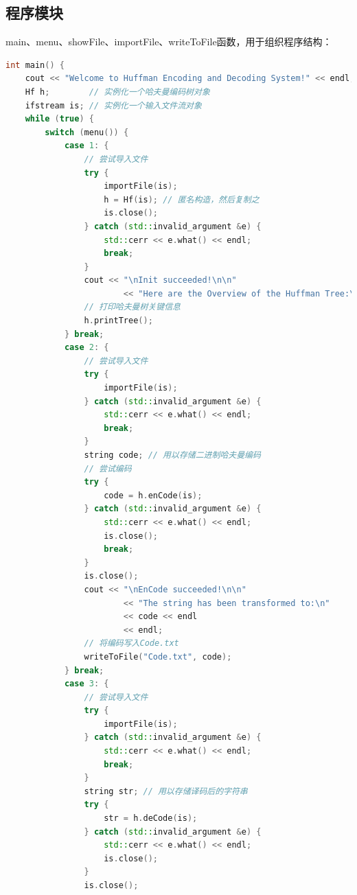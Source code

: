 \documentclass{ctexart}
\begin{document}
    \subsection{程序模块}
    main、menu、showFile、importFile、writeToFile函数，用于组织程序结构：
\begin{lstlisting}[language=C++,caption=main函数,label=code3]
int main() {
    cout << "Welcome to Huffman Encoding and Decoding System!" << endl;
    Hf h;        // 实例化一个哈夫曼编码树对象
    ifstream is; // 实例化一个输入文件流对象
    while (true) {
        switch (menu()) {
            case 1: {
                // 尝试导入文件
                try {
                    importFile(is);
                    h = Hf(is); // 匿名构造，然后复制之
                    is.close();
                } catch (std::invalid_argument &e) {
                    std::cerr << e.what() << endl;
                    break;
                }
                cout << "\nInit succeeded!\n\n"
                        << "Here are the Overview of the Huffman Tree:\n\n";
                // 打印哈夫曼树关键信息
                h.printTree();
            } break;
            case 2: {
                // 尝试导入文件
                try {
                    importFile(is);
                } catch (std::invalid_argument &e) {
                    std::cerr << e.what() << endl;
                    break;
                }
                string code; // 用以存储二进制哈夫曼编码
                // 尝试编码
                try {
                    code = h.enCode(is);
                } catch (std::invalid_argument &e) {
                    std::cerr << e.what() << endl;
                    is.close();
                    break;
                }
                is.close();
                cout << "\nEnCode succeeded!\n\n"
                        << "The string has been transformed to:\n"
                        << code << endl
                        << endl;
                // 将编码写入Code.txt
                writeToFile("Code.txt", code);
            } break;
            case 3: {
                // 尝试导入文件
                try {
                    importFile(is);
                } catch (std::invalid_argument &e) {
                    std::cerr << e.what() << endl;
                    break;
                }
                string str; // 用以存储译码后的字符串
                try {
                    str = h.deCode(is);
                } catch (std::invalid_argument &e) {
                    std::cerr << e.what() << endl;
                    is.close();
                }
                is.close();

\end{lstlisting}
\end{document}
